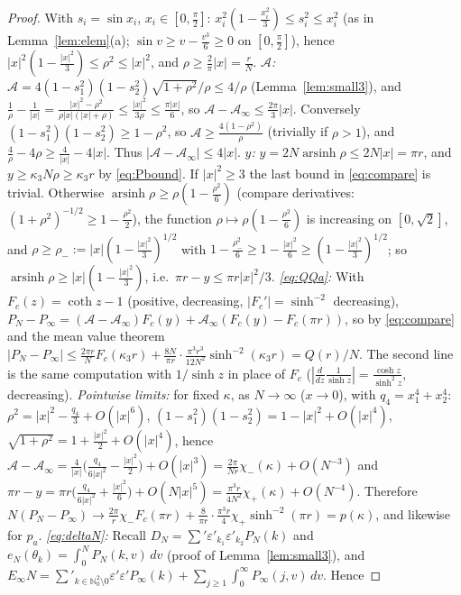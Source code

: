 \documentclass[11pt,a4paper]{article}
\theoremstyle{plain}
\theoremstyle{definition}
\numberwithin{equation}{section}
\begin{document}
\begin{proof}
With $s_i=\sin x_i$, $x_i\in[0,\frac\pi2]$: $x_i^2(1-\frac{x_i^2}{3})\le s_i^2\le x_i^2$ (as in Lemma~\ref{lem:elem}(a); $\sin v\ge v-\frac{v^3}6\ge0$ on $[0,\frac\pi2]$), hence $|x|^2(1-\frac{|x|^2}3)\le\rho^2\le|x|^2$, and $\rho\ge\frac2\pi|x|=\frac rN$.
\emph{$\mathcal A$:} $\mathcal A=4(1-s_1^2)(1-s_2^2)\sqrt{1+\rho^2}/\rho\le4/\rho$ (Lemma~\ref{lem:small3}), and $\frac1\rho-\frac1{|x|}=\frac{|x|^2-\rho^2}{\rho|x|(|x|+\rho)}\le\frac{|x|^2}{3\rho}\le\frac{\pi|x|}{6}$, so $\mathcal A-\mathcal A_\infty\le\frac{2\pi}3|x|$. Conversely $(1-s_1^2)(1-s_2^2)\ge1-\rho^2$, so $\mathcal A\ge\frac{4(1-\rho^2)}{\rho}$ (trivially if $\rho>1$), and $\frac4\rho-4\rho\ge\frac4{|x|}-4|x|$. Thus $|\mathcal A-\mathcal A_\infty|\le4|x|$.
\emph{$y$:} $y=2N\operatorname{arsinh}\rho\le2N|x|=\pi r$, and $y\ge\kappa_3N\rho\ge\kappa_3r$ by \eqref{eq:Pbound}. If $|x|^2\ge3$ the last bound in \eqref{eq:compare} is trivial. Otherwise $\operatorname{arsinh}\rho\ge\rho(1-\frac{\rho^2}6)$ (compare derivatives: $(1+\rho^2)^{-1/2}\ge1-\frac{\rho^2}{2}$), the function $\rho\mapsto\rho(1-\frac{\rho^2}6)$ is increasing on $[0,\sqrt2]$, and $\rho\ge\rho_-:=|x|(1-\frac{|x|^2}{3})^{1/2}$ with $1-\frac{\rho_-^2}{6}\ge1-\frac{|x|^2}{6}\ge(1-\frac{|x|^2}{3})^{1/2}$; so $\operatorname{arsinh}\rho\ge|x|(1-\frac{|x|^2}3)$, i.e.\ $\pi r-y\le\pi r|x|^2/3$.
\emph{\eqref{eq:QQa}:} With $F_c(z)=\coth z-1$ (positive, decreasing, $|F_c'|=\sinh^{-2}$ decreasing), $P_N-P_\infty=(\mathcal A-\mathcal A_\infty)F_c(y)+\mathcal A_\infty(F_c(y)-F_c(\pi r))$, so by \eqref{eq:compare} and the mean value theorem $|P_N-P_\infty|\le\frac{2\pi r}{N}F_c(\kappa_3r)+\frac{8N}{\pi r}\cdot\frac{\pi^3r^3}{12N^2}\sinh^{-2}(\kappa_3r)=Q(r)/N$. The second line is the same computation with $1/\sinh z$ in place of $F_c$ ($|\frac{d}{dz}\frac1{\sinh z}|=\frac{\cosh z}{\sinh^2z}$, decreasing).
\emph{Pointwise limits:} for fixed $\kappa$, as $N\to\infty$ ($x\to0$), with $q_4=x_1^4+x_2^4$: $\rho^2=|x|^2-\frac{q_4}3+O(|x|^6)$, $(1-s_1^2)(1-s_2^2)=1-|x|^2+O(|x|^4)$, $\sqrt{1+\rho^2}=1+\frac{|x|^2}2+O(|x|^4)$, hence
$\mathcal A-\mathcal A_\infty=\frac{4}{|x|}\big(\frac{q_4}{6|x|^2}-\frac{|x|^2}{2}\big)+O(|x|^3)=\frac{2\pi}{Nr}\chi_-(\kappa)+O(N^{-3})$ and
$\pi r-y=\pi r\big(\frac{q_4}{6|x|^2}+\frac{|x|^2}6\big)+O(N|x|^5)=\frac{\pi^3r}{4N^2}\chi_+(\kappa)+O(N^{-4})$. Therefore
$N(P_N-P_\infty)\to\frac{2\pi}{r}\chi_-F_c(\pi r)+\frac{8}{\pi r}\cdot\frac{\pi^3r}{4}\chi_+\sinh^{-2}(\pi r)=p(\kappa)$, and likewise for $p_a$.
\emph{\eqref{eq:deltaN}:} Recall $D_N=\sum'\varepsilon'_{k_1}\varepsilon'_{k_2}P_N(k)$ and $e_N(\theta_k)=\int_0^NP_N(k,v)\,dv$ (proof of Lemma~\ref{lem:small3}), and $E_\infty N=\sum'_{k\in\mathbb N_0^2\setminus0}\varepsilon'\varepsilon'P_\infty(k)+\sum_{j\ge1}\int_0^\infty P_\infty(j,v)\,dv$. Hence

\end{proof}
\end{document}
